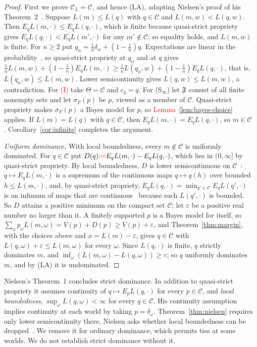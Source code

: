 \documentclass[11pt]{article}
\theoremstyle{definition}
\theoremstyle{remark}
\newcommand{\C}{\mathcal C}
\newcommand{\F}{\mathfrak F}
\begin{document}
\begin{proof}


First we prove $\C_L=\C$, and hence (LA), adapting Nielsen's proof of his Theorem~2~\cite{Nielsen}. Suppose $L(m)\le L(q)$ with $q\in\C$ and $L(m,w)<L(q,w)$. Then $E_qL(m,\cdot)\le E_qL(q,\cdot)$, which is finite because quasi-strict propriety gives $E_qL(q,\cdot)<E_qL(m',\cdot)$ for any $m'\notin\C$; so equality holds, and $L(m,w)$ is finite. For $n\ge2$ put $q_n=\frac1n\delta_w+(1-\frac1n)q$. Expectations are linear in the probability~\cite[Appendix~A, Proposition~1]{Nielsen}, so quasi-strict propriety at $q_n$ and at $q$ gives $\frac1nL(m,w)+(1-\frac1n)E_qL(m,\cdot)\ge\frac1nL(q_n,w)+(1-\frac1n)E_qL(q,\cdot)$, that is, $L(q_n,w)\le L(m,w)$. Lower semicontinuity gives $L(q,w)\le L(m,w)$, a contradiction. For \textcolor{red}{(I)} take $\Theta=\C$ and $c_q=q$. For (S$_\infty$) let $\F$ consist of all finite nonempty sets and let $\sigma_F(p)$ be $p$, viewed as a member of $\C$. Quasi-strict propriety makes $\sigma_F(p)$ a Bayes model for $p$, so \textcolor{red}{Lemma~\ref{lem:bayes-choice}} applies. If $L(m)=L(q)$ with $q\in\C$, then $E_qL(m,\cdot)=E_qL(q,\cdot)$, so $m\in\C$. Corollary~\ref{cor:infinite} completes the argument.

\emph{Uniform dominance.} With local boundedness, every $m\notin\C$ is uniformly dominated. For $q\in\C$ put $D(q)\textcolor{red}{:=}E_qL(m,\cdot)-E_qL(q,\cdot)$, which lies in $(0,\infty]$ by quasi-strict propriety. By local boundedness, $D$ is lower semicontinuous on $\C$~\cite[Lemma~3]{Nielsen}: $q\mapsto E_qL(m,\cdot)$ is a supremum of the continuous maps $q\mapsto q(h)$ over bounded $h\le L(m,\cdot)$, and, by quasi-strict propriety, $E_qL(q,\cdot)=\min_{q'\in\C}E_qL(q',\cdot)$ is an infimum of maps that are continuous~\cite[Lemma~1]{Nielsen} because each $L(q',\cdot)$ is bounded. So $D$ attains a positive minimum on the compact set $\C$; let $\varepsilon$ be a positive real number no larger than it. A finitely supported $p$ is a Bayes model for itself, so $\sum_\omega p_\omega L(m,\omega)=V(p)+D(p)\ge V(p)+\varepsilon$, and Theorem~\ref{thm:margin}, with the choices above and $x=L(m)-\varepsilon$, gives $q\in\C$ with $L(q,\omega)+\varepsilon\le L(m,\omega)$ for every $\omega$. Since $L(q,\cdot)$ is finite, $q$ strictly dominates $m$, and $\inf_\omega(L(m,\omega)-L(q,\omega))\ge\varepsilon$; so $q$ uniformly dominates $m$, and by (LA) it is undominated.
\end{proof}

Nielsen's Theorem~1 concludes strict dominance. In addition to quasi-strict propriety it assumes continuity of $q\mapsto E_pL(q,\cdot)$ for every $p\in\C$, and \emph{local boundedness}, $\sup_\omega L(q,\omega)<\infty$ for every $q\in\C$. His continuity assumption implies continuity at each world by taking $p=\delta_\omega$. Theorem~\ref{thm:nielsen} requires only lower semicontinuity there. Nielsen asks whether local boundedness can be dropped~\cite[\S4.2.1]{Nielsen}. We remove it for ordinary dominance, which permits ties at some worlds. We do not establish strict dominance without it.
\end{document}
